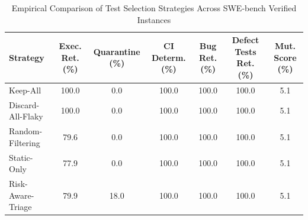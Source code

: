 \begin{table}[t]
\centering
\caption{Empirical Comparison of Test Selection Strategies Across SWE-bench Verified Instances}
\label{tab:strategy_comparison}
\begin{tabular}{lcccccc}
\toprule
\textbf{Strategy} & \textbf{Exec. Ret. (\%)} & \textbf{Quarantine (\%)} & \textbf{CI Determ. (\%)} & \textbf{Bug Ret. (\%)} & \textbf{Defect Tests Ret. (\%)} & \textbf{Mut. Score (\%)} \\
\midrule
Keep-All & 100.0 & 0.0 & 100.0 & 100.0 & 100.0 & 5.1 \\
Discard-All-Flaky & 100.0 & 0.0 & 100.0 & 100.0 & 100.0 & 5.1 \\
Random-Filtering & 79.6 & 0.0 & 100.0 & 100.0 & 100.0 & 5.1 \\
Static-Only & 77.9 & 0.0 & 100.0 & 100.0 & 100.0 & 5.1 \\
Risk-Aware-Triage & 79.9 & 18.0 & 100.0 & 100.0 & 100.0 & 5.1 \\
\bottomrule
\end{tabular}
\end{table}